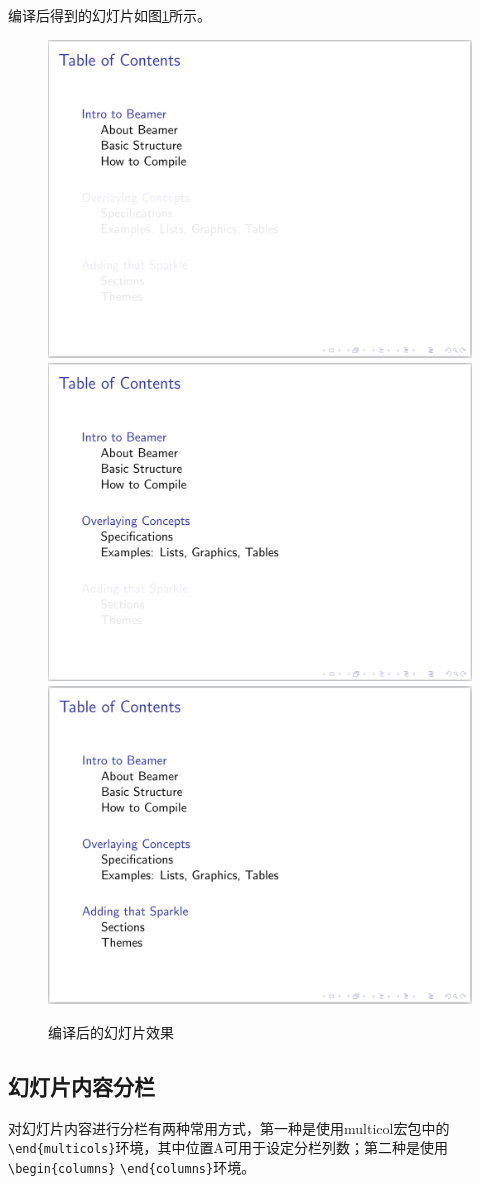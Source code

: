 编译后得到的幻灯片如图\ref{fig:909}所示。

\begin{figure}[htbp]
    \centering
    \includegraphics[width = 0.45\linewidth]{images/ch_9/example11_1.png}
    \includegraphics[width = 0.45\linewidth]{images/ch_9/example11_2.png}
    \includegraphics[width = 0.45\linewidth]{images/ch_9/example11_3.png}
    \caption{编译后的幻灯片效果}
    \label{fig:909}
\end{figure}

\subsection{幻灯片内容分栏}

对幻灯片内容进行分栏有两种常用方式，第一种是使用multicol宏包中的 \texttt{\textbackslash{}end\{multicols\}}环境，其中位置A可用于设定分栏列数；第二种是使用\texttt{\textbackslash{}begin\{columns\}} \texttt{\textbackslash{}end\{columns\}}环境。

